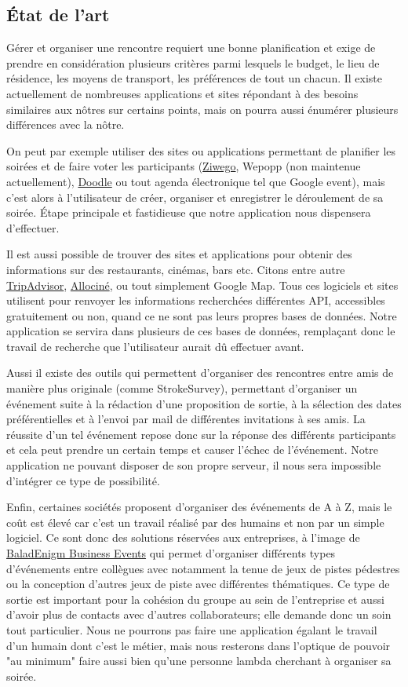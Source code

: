 \documentclass[a4paper, 12pt, notitlepage]{article} %
\begin{document}
\subsection{État de l'art}
Gérer et organiser une rencontre requiert une bonne planification et exige de prendre en considération plusieurs critères parmi lesquels le budget, le lieu de résidence, les moyens de transport, les préférences de tout un chacun.
Il existe actuellement de nombreuses applications et sites répondant à des besoins similaires aux nôtres sur certains points, mais on pourra aussi énumérer plusieurs différences avec la nôtre.

On peut par exemple utiliser des sites ou applications permettant de planifier les soirées et de faire voter les participants (\href{http://ziwego.com/fr}{Ziwego}, Wepopp (non maintenue actuellement), \href{http://doodle.com/fr/}{Doodle} ou tout agenda électronique tel que Google event), mais c'est alors à l'utilisateur de créer, organiser et enregistrer le déroulement de sa soirée. Étape principale et fastidieuse que notre application nous dispensera d'effectuer.

Il est aussi possible de trouver des sites et applications pour obtenir des informations sur des restaurants, cinémas, bars etc. Citons entre autre \href{https://www.tripadvisor.fr/}{TripAdvisor}, \href{http://www.allocine.fr/}{Allociné}, ou tout simplement Google Map.
Tous ces logiciels et sites utilisent pour renvoyer les informations recherchées différentes API, accessibles gratuitement ou non, quand ce ne sont pas leurs propres bases de données. Notre application se servira dans plusieurs de ces bases de données, remplaçant donc le travail de recherche que l'utilisateur aurait dû effectuer avant.

Aussi il existe des outils qui permettent d'organiser des rencontres entre amis de manière plus originale (comme StrokeSurvey), permettant d'organiser un événement suite à la rédaction d'une proposition de sortie, à la sélection des dates préférentielles et à l'envoi par mail de différentes invitations à ses amis. La réussite d'un tel événement repose donc sur la réponse des différents participants et cela peut prendre un certain temps et causer l'échec de l'événement. Notre application ne pouvant disposer de son propre serveur, il nous sera impossible d'intégrer ce type de possibilité.

Enfin, certaines sociétés proposent d'organiser des événements de A à Z, mais le coût est élevé car c'est un travail réalisé par des humains et non par un simple logiciel. Ce sont donc des solutions réservées aux entreprises, à l'image de \href{http://www.baladenigm.com/}{BaladEnigm Business Events} qui permet d'organiser différents types d'événements entre collègues avec notamment la tenue de jeux de pistes pédestres ou la conception d'autres jeux de piste avec différentes thématiques. Ce type de sortie est important pour la cohésion du groupe au sein de l'entreprise et aussi d'avoir plus de contacts avec d'autres collaborateurs; elle demande donc un soin tout particulier. Nous ne pourrons pas faire une application égalant le travail d'un humain dont c'est le métier, mais nous resterons dans l'optique de pouvoir "au minimum" faire aussi bien qu'une personne lambda cherchant à organiser sa soirée.
\end{document}
